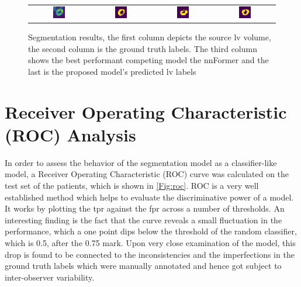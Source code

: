 \begin{figure}[htbp]
{\begin{tabular}{cccc}
\includegraphics[width=0.22\textwidth]{images/segs/sagittal_input.png} &
\includegraphics[width=0.22\textwidth]{images/segs/sagittal_gt.png} &
\includegraphics[width=0.22\textwidth]{images/segs/sagittal_pred.png}&
\includegraphics[width=0.22\textwidth]{images/segs/sagittal_pred_SP.png} \\
\end{tabular}
}
\caption{Segmentation results, the first column depicts the source \gls{lv} volume, the second column is the ground truth labels. The third column shows the best performant competing model the nnFormer and the last is the proposed model's predicted \gls{lv} labels}
\label{Fig:preds}
\end{figure}

\section{Receiver Operating Characteristic (ROC) Analysis}
In order to assess the behavior of the segmentation model as a classifier-like model, a Receiver Operating Characteristic (ROC) curve was calculated on the test set of the patients, which is shown in \cref{Fig:roc}. ROC is a very well established method which helps to evaluate the discriminative power of a model. It works by plotting the \gls{tpr} against the \gls{fpr} across a number of thresholds. An interesting finding is the fact that the curve reveals a small fluctuation in the performance, which a one point dips below the threshold of the random classifier, which is 0.5, after the 0.75 mark. Upon very close examination of the model, this drop is found to be connected to the inconsistencies and the imperfections in the ground truth labels which were manually annotated and hence got subject to inter-observer variability.

